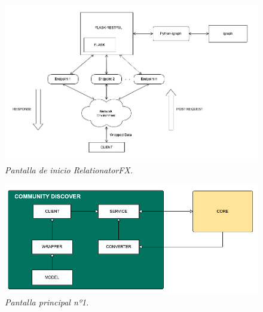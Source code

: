 \begin{figure}[H]
	\centering
	\includegraphics[scale=.4]{images/Figura6-1}
	\caption{\em Pantalla de inicio RelationatorFX.}
	\label{fig:ps-im1}
\end{figure}

\begin{figure}[H]
	\centering
	\includegraphics[scale=.4]{images/Figura6-2}
	\caption{\em Pantalla principal nº1.}
	\label{fig:ps-im2}
\end{figure}

